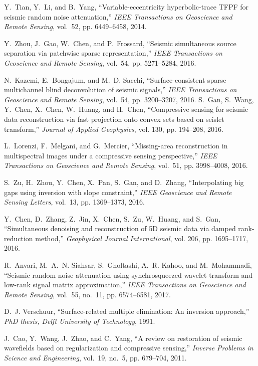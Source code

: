 \begin{thebibliography}{00}
Y.~Tian, Y.~Li, and B.~Yang, ``Variable-eccentricity hyperbolic-trace {TFPF}
  for seismic random noise attenuation,'' \emph{IEEE Transactions on Geoscience
  and Remote Sensing}, vol.~52, pp. 6449--6458, 2014.

Y.~Zhou, J.~Gao, W.~Chen, and P.~Frossard, ``Seismic simultaneous source
  separation via patchwise sparse representation,'' \emph{IEEE Transactions on
  Geoscience and Remote Sensing}, vol.~54, pp. 5271--5284, 2016.

N.~Kazemi, E.~Bongajum, and M.~D. Sacchi, ``Surface-consistent sparse
  multichannel blind deconvolution of seismic signals,'' \emph{IEEE
  Transactions on Geoscience and Remote Sensing}, vol.~54, pp. 3200--3207,
  2016.
S.~Gan, S.~Wang, Y.~Chen, X.~Chen, W.~Huang, and H.~Chen, ``Compressive sensing
  for seismic data reconstruction via fast projection onto convex sets based on
  seislet transform,'' \emph{Journal of Applied Geophysics}, vol. 130, pp.
  194--208, 2016.

L.~Lorenzi, F.~Melgani, and G.~Mercier, ``Missing-area reconstruction in
  multispectral images under a compressive sensing perspective,'' \emph{IEEE
  Transactions on Geoscience and Remote Sensing}, vol.~51, pp. 3998--4008,
  2016.

S.~Zu, H.~Zhou, Y.~Chen, X.~Pan, S.~Gan, and D.~Zhang, ``Interpolating big gaps
  using inversion with slope constraint,'' \emph{IEEE Geoscience and Remote
  Sensing Letters}, vol.~13, pp. 1369--1373, 2016.

Y.~Chen, D.~Zhang, Z.~Jin, X.~Chen, S.~Zu, W.~Huang, and S.~Gan, ``Simultaneous
  denoising and reconstruction of 5{D} seismic data via damped rank-reduction
  method,'' \emph{Geophysical Journal International}, vol. 206, pp. 1695--1717,
  2016.

R.~Anvari, M.~A.~N. Siahsar, S.~Gholtashi, A.~R. Kahoo, and M.~Mohammadi,
  ``Seismic random noise attenuation using synchrosqueezed wavelet transform
  and low-rank signal matrix approximation,'' \emph{IEEE Transactions on
  Geoscience and Remote Sensing}, vol.~55, no.~11, pp. 6574--6581, 2017.

D.~J. Verschuur, ``Surface-related multiple elimination: An inversion
  approach,'' \emph{PhD thesis, Delft University of Technology}, 1991.

J.~Cao, Y.~Wang, J.~Zhao, and C.~Yang, ``A review on restoration of seismic
  wavefields based on regularization and compressive sensing,'' \emph{Inverse
  Problems in Science and Engineering}, vol.~19, no.~5, pp. 679--704, 2011.


\end{thebibliography}
